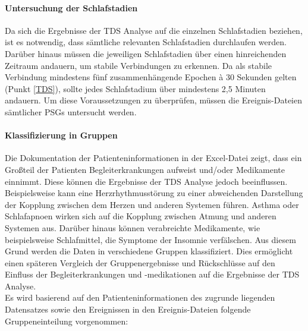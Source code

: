 \paragraph{Untersuchung der Schlafstadien} 
Da sich die Ergebnisse der \acs{TDS} Analyse auf die einzelnen Schlafstadien beziehen, ist es notwendig, dass sämtliche relevanten Schlafstadien durchlaufen werden. Darüber hinaus müssen die jeweiligen Schlafstadien über einen hinreichenden Zeitraum andauern, um stabile Verbindungen zu erkennen. Da als stabile Verbindung mindestens fünf zusammenhängende Epochen \`{a} 30 Sekunden gelten (Punkt \ref{TDS}), sollte jedes Schlafstadium über mindestens 2,5 Minuten andauern. Um diese Voraussetzungen zu überprüfen, müssen die Ereignis-Dateien sämtlicher \acs{PSG}s untersucht werden.

\paragraph{Klassifizierung in Gruppen}
Die Dokumentation der Patienteninformationen in der Excel-Datei zeigt, dass ein Großteil der Patienten Begleiterkrankungen aufweist und/oder Medikamente einnimmt. Diese können die Ergebnisse der \acs{TDS} Analyse jedoch beeinflussen. Beispielsweise kann eine Herzrhythmusstörung zu einer abweichenden Darstellung der Kopplung zwischen dem Herzen und anderen Systemen führen. Asthma oder Schlafapnoen wirken sich auf die Kopplung zwischen Atmung und anderen Systemen aus. Darüber hinaus können verabreichte Medikamente, wie beispielsweise Schlafmittel, die Symptome der Insomnie verfälschen. Aus diesem Grund werden die Daten in verschiedene Gruppen klassifiziert. Dies ermöglicht einen späteren Vergleich der Gruppenergebnisse und Rückschlüsse auf den Einfluss der Begleiterkrankungen und -medikationen auf die Ergebnisse der \acs{TDS} Analyse.\\

Es wird basierend auf den Patienteninformationen des zugrunde liegenden Datensatzes sowie den Ereignissen in den Ereignis-Dateien folgende Gruppeneinteilung vorgenommen:

